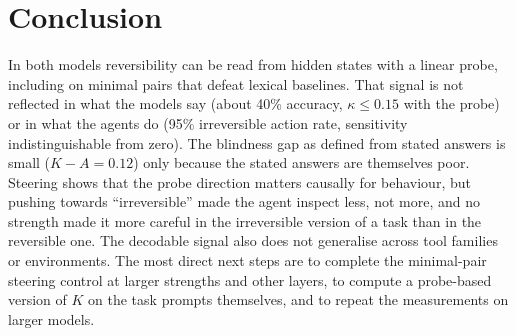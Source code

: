 \documentclass[11pt]{article}
\begin{document}
\section{Conclusion}

In both models reversibility can be read from hidden states with a linear probe, including
on minimal pairs that defeat lexical baselines. That signal is not reflected in what the models
say (about 40\% accuracy, $\kappa \leq 0.15$ with the probe) or in what the agents do (95\%
irreversible action rate, sensitivity indistinguishable from zero). The blindness gap as defined
from stated answers is small ($K - A = 0.12$) only because the stated answers are themselves
poor. Steering shows that the probe direction matters causally for behaviour, but pushing towards
``irreversible'' made the agent inspect less, not more, and no strength made it more careful in
the irreversible version of a task than in the reversible one. The decodable signal also does not generalise across tool
families or environments. The most direct next steps are to complete the
minimal-pair steering control at larger strengths and other layers, to compute a probe-based
version of $K$ on the task prompts themselves, and to repeat the measurements on larger models.


\end{document}
